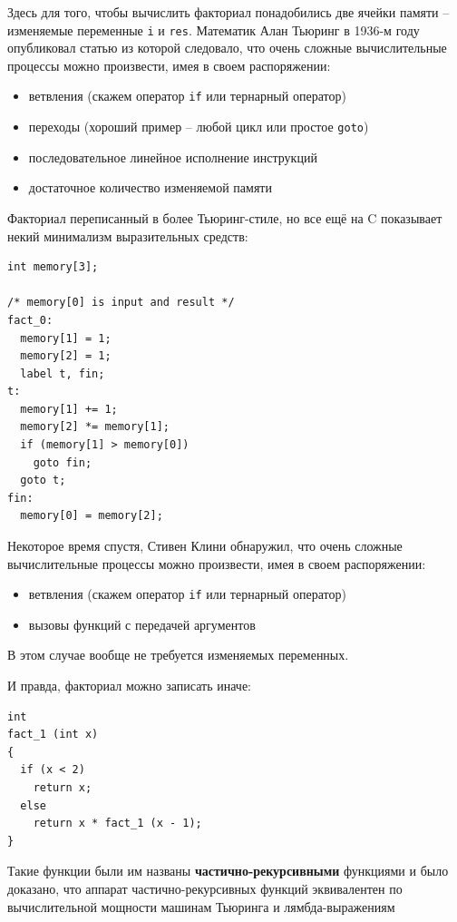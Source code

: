\documentclass[a4paper,12pt,oneside]{article}
\begin{document}
Здесь для того, чтобы вычислить факториал понадобились две ячейки памяти -- изменяемые переменные \lstinline!i! и \lstinline!res!. Математик Алан Тьюринг в 1936-м году опубликовал статью из которой следовало, что очень сложные вычислительные процессы можно произвести, имея в своем распоряжении:

\begin{itemize}
\item ветвления (скажем оператор \lstinline!if! или тернарный оператор)
\item переходы (хороший пример -- любой цикл или простое \lstinline!goto!)
\item последовательное линейное исполнение инструкций
\item достаточное количество изменяемой памяти
\end{itemize}

Факториал переписанный в более Тьюринг-стиле, но все ещё на C показывает некий минимализм выразительных средств:

\begin{lstlisting}
int memory[3];

/* memory[0] is input and result */
fact_0:
  memory[1] = 1;
  memory[2] = 1;
  label t, fin;
t:
  memory[1] += 1;
  memory[2] *= memory[1];
  if (memory[1] > memory[0]) 
    goto fin;
  goto t;
fin:
  memory[0] = memory[2];
\end{lstlisting}

Некоторое время спустя, Стивен Клини обнаружил, что очень сложные вычислительные процессы можно произвести, имея в своем распоряжении:

\begin{itemize}
\item ветвления (скажем оператор \lstinline!if! или тернарный оператор)
\item вызовы функций с передачей аргументов
\end{itemize}

В этом случае вообще не требуется изменяемых переменных.

И правда, факториал можно записать иначе:

\begin{lstlisting}
int
fact_1 (int x)
{
  if (x < 2)
    return x;
  else
    return x * fact_1 (x - 1);
}
\end{lstlisting}

Такие функции были им названы \textbf{частично-рекурсивными} функциями и было доказано, что аппарат частично-рекурсивных функций эквивалентен по вычислительной мощности машинам Тьюринга и лямбда-выражениям
\end{document}
